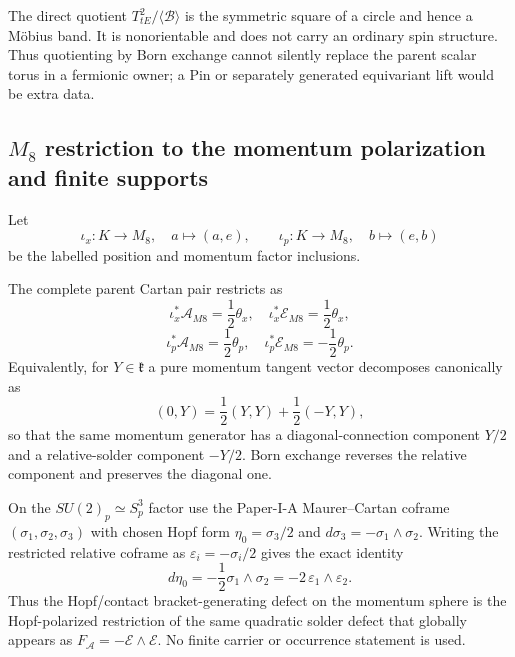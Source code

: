 \documentclass[12pt,a4paper]{article}
\begin{document}
\begin{remark}
\label{p3b:rem:v190-born-quotient-spin-firewall}
The direct quotient $T^2_{tE}/\langle\mathcal B\rangle$ is the symmetric
square of a circle and hence a M\"obius band.  It is nonorientable and does not
carry an ordinary spin structure.  Thus quotienting by Born exchange cannot
silently replace the parent scalar torus in a fermionic owner; a Pin or
separately generated equivariant lift would be extra data.
\end{remark}

\subsection{$M_8$ restriction to the momentum polarization and finite supports}
\label{p3b:sec:v188-m8-momentum-restriction}

Let
\[
 \iota_x:K\to M_8,\quad a\mapsto(a,e),
 \qquad
 \iota_p:K\to M_8,\quad b\mapsto(e,b)
\]
be the labelled position and momentum factor inclusions.

\begin{theorem}
\label{p3b:thm:v188-momentum-cartan-restriction}
The complete parent Cartan pair restricts as
\[
 \boxed{\iota_x^*\mathcal A_{M8}=\frac12\theta_x,
 \quad \iota_x^*\mathcal E_{M8}=\frac12\theta_x,}
\]
\[
 \boxed{\iota_p^*\mathcal A_{M8}=\frac12\theta_p,
 \quad \iota_p^*\mathcal E_{M8}=-\frac12\theta_p.}
\]
Equivalently, for $Y\in\mathfrak k$ a pure momentum tangent vector decomposes
canonically as
\[
 (0,Y)=\frac12(Y,Y)+\frac12(-Y,Y),
\]
so that the same momentum generator has a diagonal-connection component
$Y/2$ and a relative-solder component $-Y/2$.  Born exchange reverses the
relative component and preserves the diagonal one.

On the $SU(2)_p\simeq S_p^3$ factor use the Paper-I-A Maurer--Cartan coframe
$(\sigma_1,\sigma_2,\sigma_3)$ with chosen Hopf form
$\eta_0=\sigma_3/2$ and $d\sigma_3=-\sigma_1\wedge\sigma_2$.  Writing the
restricted relative coframe as $\varepsilon_i=-\sigma_i/2$ gives the exact
identity
\[
 \boxed{d\eta_0=-\frac12\sigma_1\wedge\sigma_2
       =-2\,\varepsilon_1\wedge\varepsilon_2.}
\]
Thus the Hopf/contact bracket-generating defect on the momentum sphere is the
Hopf-polarized restriction of the same quadratic solder defect that globally
appears as $F_{\mathcal A}=-\mathcal E\wedge\mathcal E$.  No finite carrier
or occurrence statement is used.
\end{theorem}
\end{document}
